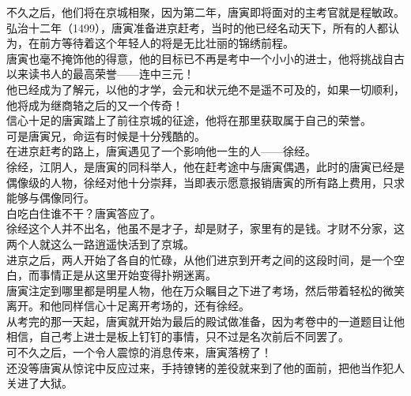 \begin{multicols}{\theparacolNo}
不久之后，他们将在京城相聚，因为第二年，唐寅即将面对的主考官就是程敏政。\\

弘治十二年（1499），唐寅准备进京赶考，当时的他已经名动天下，所有的人都认为，在前方等待着这个年轻人的将是无比壮丽的锦绣前程。\\

唐寅也毫不掩饰他的得意，他的目标已不再是考中一个小小的进士，他将挑战自古以来读书人的最高荣誉——连中三元！\\

他已经成为了解元，以他的才学，会元和状元绝不是遥不可及的，如果一切顺利，他将成为继商辂之后的又一个传奇！\\

信心十足的唐寅踏上了前往京城的征途，他将在那里获取属于自己的荣誉。\\

可是唐寅兄，命运有时候是十分残酷的。\\

在进京赶考的路上，唐寅遇见了一个影响他一生的人——徐经。\\

徐经，江阴人，是唐寅的同科举人，他在赶考途中与唐寅偶遇，此时的唐寅已经是偶像级的人物，徐经对他十分崇拜，当即表示愿意报销唐寅的所有路上费用，只求能够与偶像同行。\\

白吃白住谁不干？唐寅答应了。\\

徐经这个人并不出名，他虽不是才子，却是财子，家里有的是钱。才财不分家，这两个人就这么一路逍遥快活到了京城。\\

进京之后，两人开始了各自的忙碌，从他们进京到开考之间的这段时间，是一个空白，而事情正是从这里开始变得扑朔迷离。\\

唐寅注定到哪里都是明星人物，他在万众瞩目之下进了考场，然后带着轻松的微笑离开。和他同样信心十足离开考场的，还有徐经。\\

从考完的那一天起，唐寅就开始为最后的殿试做准备，因为考卷中的一道题目让他相信，自己考上进士是板上钉钉的事情，只不过是名次前后不同罢了。\\

可不久之后，一个令人震惊的消息传来，唐寅落榜了！\\

还没等唐寅从惊诧中反应过来，手持镣铐的差役就来到了他的面前，把他当作犯人关进了大狱。\\


\end{multicols}

